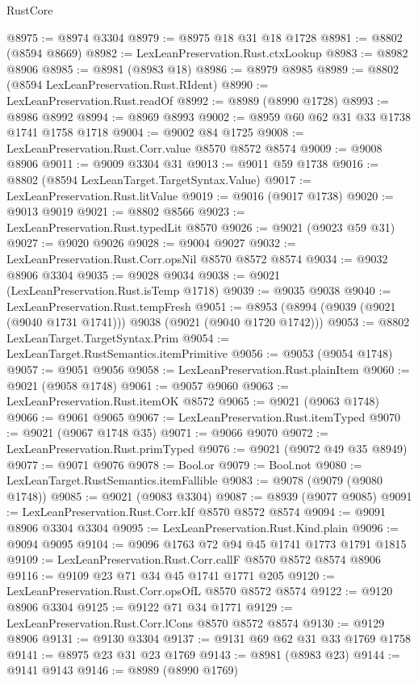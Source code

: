 \begin{lexlean}{RustCore}
\begin{coremodule}
@8975 := @8974 @3304
@8979 := @8975 @18 @31 @18 @1728
@8981 := @8802 (@8594 @8669)
@8982 := LexLeanPreservation.Rust.ctxLookup
@8983 := @8982 @8906
@8985 := @8981 (@8983 @18)
@8986 := @8979 @8985
@8989 := @8802 (@8594 LexLeanPreservation.Rust.RIdent)
@8990 := LexLeanPreservation.Rust.readOf
@8992 := @8989 (@8990 @1728)
@8993 := @8986 @8992
@8994 := @8969 @8993
@9002 := @8959 @60 @62 @31 @33 @1738 @1741 @1758 @1718
@9004 := @9002 @84 @1725
@9008 := LexLeanPreservation.Rust.Corr.value @8570 @8572 @8574
@9009 := @9008 @8906
@9011 := @9009 @3304 @31
@9013 := @9011 @59 @1738
@9016 := @8802 (@8594 LexLeanTarget.TargetSyntax.Value)
@9017 := LexLeanPreservation.Rust.litValue
@9019 := @9016 (@9017 @1738)
@9020 := @9013 @9019
@9021 := @8802 @8566
@9023 := LexLeanPreservation.Rust.typedLit @8570
@9026 := @9021 (@9023 @59 @31)
@9027 := @9020 @9026
@9028 := @9004 @9027
@9032 := LexLeanPreservation.Rust.Corr.opsNil @8570 @8572 @8574
@9034 := @9032 @8906 @3304
@9035 := @9028 @9034
@9038 := @9021 (LexLeanPreservation.Rust.isTemp @1718)
@9039 := @9035 @9038
@9040 := LexLeanPreservation.Rust.tempFresh
@9051 := @8953 (@8994 (@9039 (@9021 (@9040 @1731 @1741))) @9038 (@9021 (@9040 @1720 @1742)))
@9053 := @8802 LexLeanTarget.TargetSyntax.Prim
@9054 := LexLeanTarget.RustSemantics.itemPrimitive
@9056 := @9053 (@9054 @1748)
@9057 := @9051 @9056
@9058 := LexLeanPreservation.Rust.plainItem
@9060 := @9021 (@9058 @1748)
@9061 := @9057 @9060
@9063 := LexLeanPreservation.Rust.itemOK @8572
@9065 := @9021 (@9063 @1748)
@9066 := @9061 @9065
@9067 := LexLeanPreservation.Rust.itemTyped
@9070 := @9021 (@9067 @1748 @35)
@9071 := @9066 @9070
@9072 := LexLeanPreservation.Rust.primTyped
@9076 := @9021 (@9072 @49 @35 @8949)
@9077 := @9071 @9076
@9078 := Bool.or
@9079 := Bool.not
@9080 := LexLeanTarget.RustSemantics.itemFallible
@9083 := @9078 (@9079 (@9080 @1748))
@9085 := @9021 (@9083 @3304)
@9087 := @8939 (@9077 @9085)
@9091 := LexLeanPreservation.Rust.Corr.kIf @8570 @8572 @8574
@9094 := @9091 @8906 @3304 @3304
@9095 := LexLeanPreservation.Rust.Kind.plain
@9096 := @9094 @9095
@9104 := @9096 @1763 @72 @94 @45 @1741 @1773 @1791 @1815
@9109 := LexLeanPreservation.Rust.Corr.callF @8570 @8572 @8574 @8906
@9116 := @9109 @23 @71 @34 @45 @1741 @1771 @205
@9120 := LexLeanPreservation.Rust.Corr.opsOfL @8570 @8572 @8574
@9122 := @9120 @8906 @3304
@9125 := @9122 @71 @34 @1771
@9129 := LexLeanPreservation.Rust.Corr.lCons @8570 @8572 @8574
@9130 := @9129 @8906
@9131 := @9130 @3304
@9137 := @9131 @69 @62 @31 @33 @1769 @1758
@9141 := @8975 @23 @31 @23 @1769
@9143 := @8981 (@8983 @23)
@9144 := @9141 @9143
@9146 := @8989 (@8990 @1769)

\end{coremodule}
\end{lexlean}
